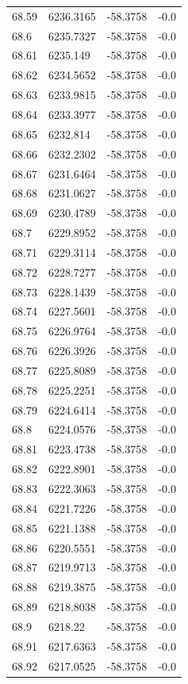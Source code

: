 \begin{table}[H]
\begin{tabular}{llll}
68.59 & 6236.3165 & -58.3758 & -0.0 \\
68.6 & 6235.7327 & -58.3758 & -0.0 \\
68.61 & 6235.149 & -58.3758 & -0.0 \\
68.62 & 6234.5652 & -58.3758 & -0.0 \\
68.63 & 6233.9815 & -58.3758 & -0.0 \\
68.64 & 6233.3977 & -58.3758 & -0.0 \\
68.65 & 6232.814 & -58.3758 & -0.0 \\
68.66 & 6232.2302 & -58.3758 & -0.0 \\
68.67 & 6231.6464 & -58.3758 & -0.0 \\
68.68 & 6231.0627 & -58.3758 & -0.0 \\
68.69 & 6230.4789 & -58.3758 & -0.0 \\
68.7 & 6229.8952 & -58.3758 & -0.0 \\
68.71 & 6229.3114 & -58.3758 & -0.0 \\
68.72 & 6228.7277 & -58.3758 & -0.0 \\
68.73 & 6228.1439 & -58.3758 & -0.0 \\
68.74 & 6227.5601 & -58.3758 & -0.0 \\
68.75 & 6226.9764 & -58.3758 & -0.0 \\
68.76 & 6226.3926 & -58.3758 & -0.0 \\
68.77 & 6225.8089 & -58.3758 & -0.0 \\
68.78 & 6225.2251 & -58.3758 & -0.0 \\
68.79 & 6224.6414 & -58.3758 & -0.0 \\
68.8 & 6224.0576 & -58.3758 & -0.0 \\
68.81 & 6223.4738 & -58.3758 & -0.0 \\
68.82 & 6222.8901 & -58.3758 & -0.0 \\
68.83 & 6222.3063 & -58.3758 & -0.0 \\
68.84 & 6221.7226 & -58.3758 & -0.0 \\
68.85 & 6221.1388 & -58.3758 & -0.0 \\
68.86 & 6220.5551 & -58.3758 & -0.0 \\
68.87 & 6219.9713 & -58.3758 & -0.0 \\
68.88 & 6219.3875 & -58.3758 & -0.0 \\
68.89 & 6218.8038 & -58.3758 & -0.0 \\
68.9 & 6218.22 & -58.3758 & -0.0 \\
68.91 & 6217.6363 & -58.3758 & -0.0 \\
68.92 & 6217.0525 & -58.3758 & -0.0 \\

\end{tabular}
\end{table}
